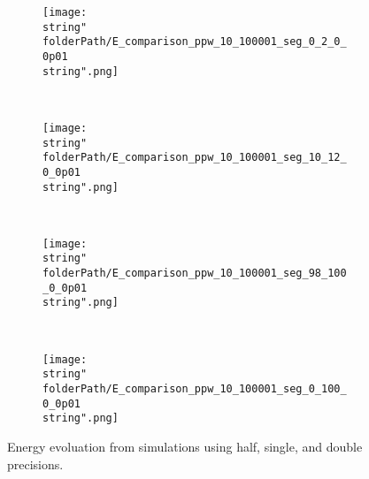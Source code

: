\begin{figure}[H]
\captionsetup{width=0.95\textwidth,font=footnotesize,labelfont=footnotesize}
\centering
%
\begin{subfigure}[b]{1\textwidth}
%
\centering\texttt{[image: \\string"\\folderPath/E\_comparison\_ppw\_10\_100001\_seg\_0\_2\_0\_0p01\\string".png]}
%
\end{subfigure}\hfill
\\[2ex]
%
\begin{subfigure}[b]{1\textwidth}
%
\centering\texttt{[image: \\string"\\folderPath/E\_comparison\_ppw\_10\_100001\_seg\_10\_12\_0\_0p01\\string".png]}
%
\end{subfigure}\hfill
\\[2ex]
%
\begin{subfigure}[b]{1\textwidth}
%
\centering\texttt{[image: \\string"\\folderPath/E\_comparison\_ppw\_10\_100001\_seg\_98\_100\_0\_0p01\\string".png]}
%
\end{subfigure}\hfill
\\[2ex]
%
\begin{subfigure}[b]{1\textwidth}
%
\centering\texttt{[image: \\string"\\folderPath/E\_comparison\_ppw\_10\_100001\_seg\_0\_100\_0\_0p01\\string".png]}
%
\end{subfigure}\hfill
%
\caption{Energy evoluation from simulations using half, single, and double precisions.}
\label{comparison_E_half_compensated_single_double_marmousi2_0_0p01_1e-3}
\end{figure}

\renewcommand{\folderPath}{\string"/dev/null\string"}